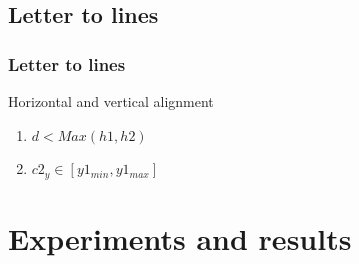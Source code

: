\documentclass[9pt]{beamer}
\begin{document}

	\subsection[Line]{Letter to lines}
		\begin{frame}
		\frametitle{Letter to lines}
		\begin{center}	
		  \vspace{1em}
		\end{center}
		
		\begin{block}{Horizontal and vertical alignment}

			\begin{enumerate}
				\item $d<Max(h1,h2)$
				\item $c2_y \in [y1_{min},y1_{max}]$
			\end{enumerate}
			
		\end{block}
		
		
		\end{frame}




\section{Experiments and results}
\end{document}
